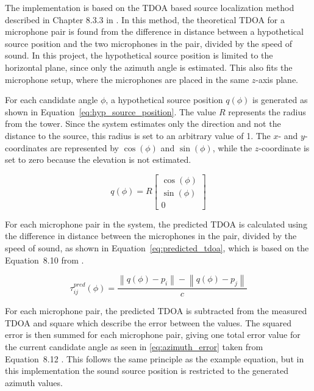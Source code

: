     The implementation is based on the TDOA based source localization method described in Chapter 8.3.3 in \cite{brandstein2001microphonearrays}. In this method, the theoretical TDOA for a microphone pair is found from the difference in distance between a hypothetical source position and the two microphones in the pair, divided by the speed of sound. In this project, the hypothetical source position is limited to the horizontal plane, since only the azimuth angle is estimated. This also fits the microphone setup, where the microphones are placed in the same \(z\)-axis plane.

    For each candidate angle \(\phi\), a hypothetical source position \(q(\phi)\) is generated as shown in Equation~\ref{eq:hyp_source_position}. The value \(R\) represents the radius from the tower. Since the system estimates only the direction and not the distance to the source, this radius is set to an arbitrary value of 1. The \(x\)- and \(y\)-coordinates are represented by \(\cos(\phi)\) and \(\sin(\phi)\), while the \(z\)-coordinate is set to zero because the elevation is not estimated.

    \begin{equation}
        q(\phi) = R
        \begin{bmatrix}
            \cos(\phi) \\
            \sin(\phi) \\
            0
        \end{bmatrix}
        \label{eq:hyp_source_position}
    \end{equation}

    For each microphone pair in the system, the predicted TDOA is calculated using the difference in distance between the microphones in the pair, divided by the speed of sound, as shown in Equation~\ref{eq:predicted_tdoa}, which is  based on the Equation~8.10 from \cite{brandstein2001microphonearrays}.

    \begin{equation}
        \tau_{ij}^{pred}(\phi) =
        \frac{\left\|q(\phi)-p_i\right\|-\left\|q(\phi)-p_j\right\|}{c}
        \label{eq:predicted_tdoa}
    \end{equation}

    For each microphone pair, the predicted TDOA is subtracted from the measured TDOA and square which describe the error between the values. The squared error is then summed for each microphone pair, giving one total error value for the current candidate angle as seen in \ref{eq:azimuth_error} taken from Equation~8.12 \cite{brandstein2001microphonearrays}. This follows the same principle as the example equation, but in this implementation the sound source position is restricted to the generated azimuth values.

